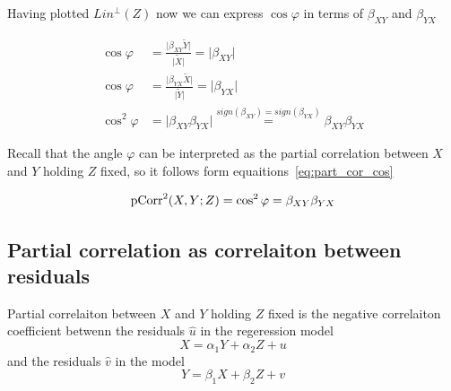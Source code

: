 Having plotted $Lin^{\perp}(Z)$ now we can express $\cos \varphi$ in terms of $\beta_{XY}$
and $\beta_{YX}$

\begin{equation}\label{eq:part_cor_cos}
\begin{split}
\cos \varphi &= \frac{\vert \beta_{XY} \widetilde Y \vert}{\vert \widetilde X \vert} = \vert \beta_{XY} \vert \\
\cos \varphi &= \frac{\vert \beta_{YX} \widetilde X \vert}{\vert \widetilde Y \vert} = \vert \beta_{YX} \vert \\
\cos^2 \varphi &= \vert \beta_{XY} \beta_{YX} \vert \stackrel{sign(\beta_{XY}) = sign(\beta_{YX})}{=} \beta_{XY} \beta_{YX}
\end{split}
\end{equation}

Recall that the angle $\varphi$ can be interpreted as the partial correlation
between $X$ and $Y$ holding $Z$ fixed, so it follows form equaitions~\eqref{eq:part_cor_cos}

\[
\operatorname{pCorr}^2(X,Y; Z) = \cos^2 \varphi = \beta_{XY} \beta_{YX}
\]

\subsection{Partial correlation as correlaiton between residuals}


\begin{theorem}
Partial correlaiton between $X$ and $Y$ holding $Z$ fixed is the negative
correlaiton coefficient betwenn the residuals $\hat u$ in the regeression model
\[
X = \alpha_1 Y + \alpha_2 Z + u
\]
and the residuals $\hat v$ in the model
\[
Y = \beta_1 X + \beta_2 Z + v
\]
\end{theorem}

